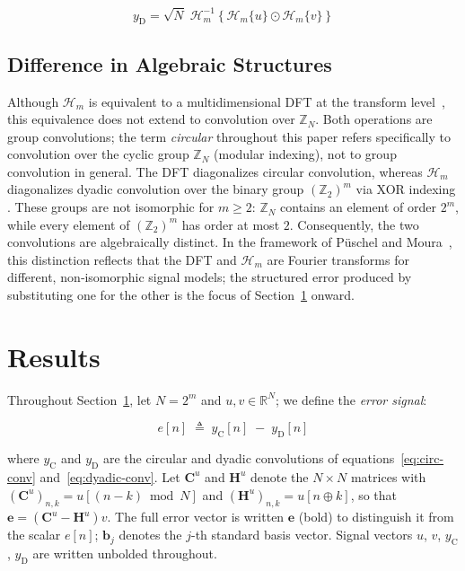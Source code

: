 \documentclass[10pt,a4paper]{amsart}
\begin{document}
\begin{equation}
      \label{eq:hadamard-thm}
      y_{\mathrm{D}} = \sqrt{N}\;\mathcal{H}_m^{-1}\!\left\{\mathcal{H}_m\{u\} \odot \mathcal{H}_m\{v\}\right\}
\end{equation}

\subsection{Difference in Algebraic Structures}
\label{sec:alg-structures}

Although $\mathcal{H}_m$ is equivalent to a multidimensional DFT at the transform level~\cite{shanks1969ITCmp.100.457S, yarlagadda1997hadamard}, this equivalence does not extend to convolution over $\mathbb{Z}_N$. Both operations are group convolutions; the term \emph{circular} throughout this paper refers specifically to convolution over the cyclic group $\mathbb{Z}_N$ (modular indexing), not to group convolution in general. The DFT diagonalizes circular convolution, whereas $\mathcal{H}_m$ diagonalizes dyadic convolution over the binary group $(\mathbb{Z}_2)^m$ via XOR indexing \cite{Terras_1999}. These groups are not isomorphic for $m \geq 2$: $\mathbb{Z}_N$ contains an element of order $2^m$, while every element of $(\mathbb{Z}_2)^m$ has order at most $2$. Consequently, the two convolutions are algebraically distinct. In the framework of P\"uschel and Moura~\cite{PueschelMoura2008_ASP_1DSpace, PueschelMoura2008_ASP_Foundation1DTime}, this distinction reflects that the DFT and $\mathcal{H}_m$ are Fourier transforms for different, non‑isomorphic signal models; the structured error produced by substituting one for the other is the focus of Section~\ref{sec:results} onward.

\section{Results}
\label{sec:results}

Throughout Section~\ref{sec:results}, let $N = 2^m$ and $u, v \in \mathbb{R}^N$; we define the \emph{error signal}:

\begin{equation}
    e[n] \;\triangleq\; y_{\mathrm{C}}[n] \;-\; y_{\mathrm{D}}[n]
\end{equation}

\noindent where $y_{\mathrm{C}}$ and $y_{\mathrm{D}}$ are the circular and dyadic convolutions of equations~\eqref{eq:circ-conv} and~\eqref{eq:dyadic-conv}. Let $\mathbf{C}^u$ and $\mathbf{H}^u$ denote the $N\times N$ matrices with $(\mathbf{C}^u)_{n,k} = u[(n-k)\bmod N]$ and $(\mathbf{H}^u)_{n,k} = u[n\oplus k]$, so that $\mathbf{e} = (\mathbf{C}^u - \mathbf{H}^u)v$. The full error vector is written $\mathbf{e}$ (bold) to distinguish it from the scalar $e[n]$; $\mathbf{b}_j$ denotes the $j$-th standard basis vector. Signal vectors $u$, $v$, $y_{\mathrm{C}}$, $y_{\mathrm{D}}$ are written unbolded throughout.
\end{document}
